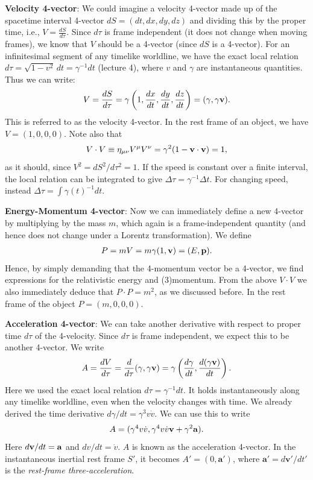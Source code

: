 \documentclass[12pt]{article}
\newcommand{\be}{\begin{eqnarray}}
\newcommand{\ee}{\end{eqnarray}}
\begin{document}
\vspace{2em}

\noindent 
{\bf Velocity 4-vector}: We could imagine a velocity 4-vector made up of the spacetime interval 4-vector $dS = (dt, dx,dy,dz)$ and dividing this by the proper time, i.e., $V = \frac{dS}{d\tau}$.  Since $d\tau$ is frame independent (it does not change when moving frames), we know that $V$ should be a 4-vector (since $dS$ is a 4-vector). For an infinitesimal segment of any timelike worldline, we have the exact local relation $d\tau = \sqrt{1-v^2}\,dt = \gamma^{-1}dt$ (lecture 4), where $v$ and $\gamma$ are instantaneous quantities. Thus we can write:
\be
V = \frac{dS}{d\tau} = \gamma\left(1, \frac{dx}{dt}, \frac{dy}{dt}, \frac{dz}{dt}\right) = (\gamma, \gamma {\bf v}).
\ee
This is referred to as the velocity 4-vector. In the rest frame of an object, we have $V = (1,0,0,0)$. Note also that 
\be
V\cdot V \equiv \eta_{\mu \nu} V^{\mu} V^{\nu} = \gamma^2(1-{\bf v} \cdot {\bf v}) = 1, 
\ee
as it should, since $V^2 = dS^2/d\tau^2 = 1$. If the speed is constant over a finite interval, the local relation can be integrated to give $\Delta\tau=\gamma^{-1}\Delta t$. For changing speed, instead $\Delta\tau=\int \gamma(t)^{-1}dt$.

\vspace{2em}

\noindent 
{\bf Energy-Momentum 4-vector}: Now we can immediately define a new 4-vector by multiplying by the mass $m$, which again is a frame-independent quantity (and hence does not change under a Lorentz transformation). We define
\be
P = mV = m\gamma(1,{\bf v}) = (E, {\bf p}). 
\ee
Hence, by simply demanding that the 4-momentum vector be a 4-vector, we find expressions for the relativistic energy and (3)momentum. From the above $V\cdot V$ we also immediately deduce that $P\cdot P = m^2$, as we discussed before. In the rest frame of the object $P = (m,0,0,0)$. 


\vspace{2em}

\noindent 
{\bf Acceleration 4-vector}: We can take another derivative with respect to proper time $d\tau$ of the 4-velocity. Since $d\tau$ is frame independent, we expect this to be another 4-vector. We write 
\be
A = \frac{dV}{d\tau} = \frac{d}{d\tau}(\gamma, \gamma{\bf v}) = \gamma\left(\frac{d\gamma}{dt}, \frac{d(\gamma{\bf v})}{dt}\right).
\ee
Here we used the exact local relation $d\tau=\gamma^{-1}dt$. It holds instantaneously along any timelike worldline, even when the velocity changes with time. We already derived the time derivative $d\gamma/dt=\gamma^3v\dot v$. We can use this to write
\be
A = (\gamma^4 v \dot{v}, \gamma^4 v \dot{v} {\bf v}+ \gamma^2{\bf a}).
\ee
Here $d{\bf v}/dt = {\bf a}$ and $dv/dt = \dot{v}$. $A$ is known as the acceleration 4-vector. In the instantaneous inertial rest frame $S'$, it becomes $A'=(0,\mathbf a')$, where $\mathbf a'=d\mathbf v'/dt'$ is the \emph{rest-frame three-acceleration}.
\end{document}
